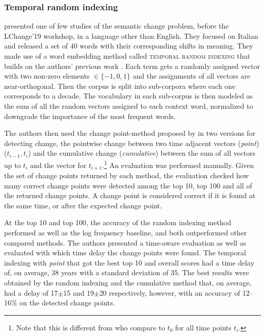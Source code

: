 \documentclass[output=paper]{langsci/langscibook}
\begin{document}
 
\subsubsection{Temporal random indexing} 

\citet{basilediachronic} presented one of few studies of the semantic change problem, before the LChange'19 workshop, in a language other than English. They focused on Italian and released a set of 40 words with their corresponding shifts in meaning. 
They made use of a word embedding method called \textsc{temporal random indexing} that builds on the authors' previous work \citep{basile-2014}. 
Each term 
gets a randomly assigned vector with two non-zero elements $\in \{-1,0,1\}$ and the assignments of all vectors  
are near-orthogonal. 
Then the corpus is split into sub-corpora where each one corresponds to a decade.
The vocabulary in each sub-corpus is then modeled as the sum of all the random vectors assigned to each context word,
normalized 
to downgrade the importance of the most frequent words.

The authors then used the change point-method proposed by \citet{kulkarni2015statistically} in two versions for detecting change, the pointwise change between two time adjacent vectors (\textit{point}) ($t_{i-1}, t_i$) and the cumulative change (\textit{cumulative}) between the sum of all vectors up to $t_i$ and the vector for $t_{i+1}$.\footnote{Note that this is different from \citet{kulkarni2015statistically} who compare to $t_0$ for all time points $t_i$.} 
An evaluation was performed manually. 
Given the set of change points returned by each method, the evaluation checked how many correct change points were detected among the top 10, top 100 and all of the returned change points. A change point is considered correct if it is found at the same time, or after the expected change point. 
%

At the top 10 and top 100, the accuracy of the random indexing method 
performed as well as the log frequency baseline, and both outperformed other compared methods.
The authors presented a time-aware evaluation as well as evaluated with which time delay the change points were found. The temporal indexing with \textit{point} that got the best top 10 and overall scores had a time delay of, on average, 38 years with a standard deviation of 35. The best results were obtained by the random indexing 
and the cumulative method that, on average, had a delay of 17$\pm$15 and 19$\pm$20 respectively, 
however, with an accuracy of 12--16\% on the detected change points.
\end{document}
